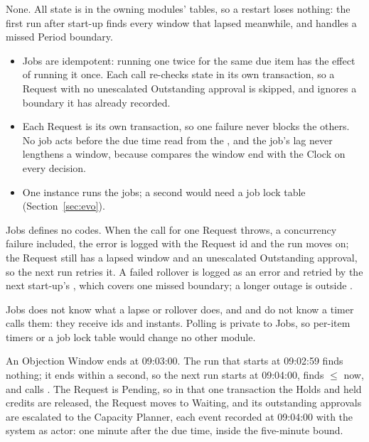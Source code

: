 None. All state is in the owning modules' tables, so a restart loses nothing: the first run after start-up finds every window that lapsed meanwhile, and  handles a missed Period boundary.

\begin{itemize}
\item Jobs are idempotent: running one twice for the same due item has the effect of running it once. Each call re-checks state in its own transaction, so a Request with no unescalated Outstanding approval is skipped, and  ignores a boundary it has already recorded.
\item Each Request is its own transaction, so one failure never blocks the others. No job acts before the due time read from the , and the job's lag never lengthens a window, because  compares the window end with the Clock on every decision.
\item One instance runs the jobs; a second would need a job lock table (Section~\ref{sec:evo}).
\end{itemize}

Jobs defines no  codes. When the call for one Request throws, a concurrency failure included, the error is logged with the Request id and the run moves on; the Request still has a lapsed window and an unescalated Outstanding approval, so the next run retries it. A failed rollover is logged as an error and retried by the next start-up's , which covers one missed boundary; a longer outage is outside .

Jobs does not know what a lapse or rollover does, and  and  do not know a timer calls them: they receive ids and instants. Polling is private to Jobs, so per-item timers or a job lock table would change no other module.

An Objection Window ends at 09:03:00. The run that starts at 09:02:59 finds nothing; it ends within a second, so the next run starts at 09:04:00, finds  $\le$ now, and calls . The Request is Pending, so in that one transaction the Holds and held credits are released, the Request moves to Waiting, and its outstanding approvals are escalated to the Capacity Planner, each event recorded at 09:04:00 with the system as actor: one minute after the due time, inside the five-minute bound.

